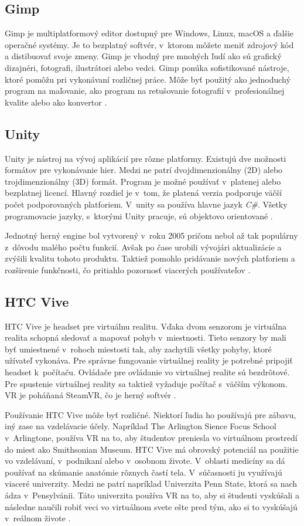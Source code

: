 \subsection{Gimp}
Gimp je multiplatformový editor dostupný pre Windows, Linux, macOS a ďalšie operačné systémy. Je to bezplatný softvér, v~ktorom môžete meniť zdrojový kód a distibuovať svoje zmeny. Gimp je vhodný pre mnohých ľudí ako sú grafický dizajnéri, fotografi, ilustrátori alebo vedci. Gimp ponúka sofistikované nástroje, ktoré pomôžu pri vykonávaní rozličnej práce. Môže byť použitý ako jednoduchý program na maľovanie, ako program na retušovanie fotografií v~profesionálnej kvalite alebo ako konvertor \cite{Gimp}.

\subsection{Unity}
Unity je nástroj na vývoj aplikácií pre rôzne platformy. Existujú dve možnosti formátov pre vykonávanie hier. Medzi ne patrí dvojdimenzionálny (2D) alebo trojdimenzionálny (3D) formát. Program je možné používať v~platenej alebo bezplatnej licencí. Hlavný rozdiel je v~tom, že platená verzia podporuje väčší počet podporovaných platforiem. V~unity sa používa hlavne jazyk \textit{C\#}. Všetky programovacie jazyky, s~ktorými Unity pracuje, sú objektovo orientované \cite{Unity-popis}.

Jednotný herný engine bol vytvorený v~roku 2005 pričom nebol až tak populárny z~dôvodu malého počtu funkcií. Avšak po čase urobili vývojári aktualizácie a zvýšili kvalitu tohoto produktu. Taktiež pomohlo pridávanie nových platforiem a rozširenie funkčnosti, čo pritiahlo pozornosť viacerých používateľov \cite{Unity}. 

\subsection{HTC Vive}
HTC Vive je headset pre virtuálnu realitu. Vďaka dvom senzorom je virtuálna realita schopná sledovať a mapovať pohyb v~miestnosti. Tieto senzory by mali byť umiestnené v~rohoch miestosti tak, aby zachytili všetky pohyby, ktoré užívateľ vykonáva. Pre správne fungovanie virtuálnej reality je potrebné pripojiť headset k~počítaču. Ovládače pre ovládanie vo virtuálnej realite sú bezdrôtové. Pre spustenie virtuálnej reality sa taktiež vyžaduje počítač s~väčším výkonom. VR je poháňaná SteamVR, čo je herný softvér \cite{HTCVive}.

Používanie HTC Vive môže byť rozličné. Niektorí ľudia ho používajú pre zábavu, iný zase na vzdelávacie účely. Napríklad The Arlington Sience Focus School v~Arlingtone, používa VR na to, aby študentov preniesla vo virtuálnom prostredí do miest ako Smithsonian Museum. HTC Vive má obrovský potenciál na použitie vo vzdelávaní, v~podnikaní alebo v~osobnom živote. V~oblasti medicíny sa dá používať na skúmanie anatómie rôznych častí tela. V~súčasnosti ju využívajú viaceré univerzity. Medzi ne patrí napríklad Univerzita Penn State, ktorá sa nach ádza v~Pensylvánii. Táto univerzita používa VR na to, aby si študenti vyskúšali a následne naučili robiť veci vo virtuálnom svete ešte pred tým, ako si to vyskúšajú v~reálnom živote \cite{HTCVive}.

